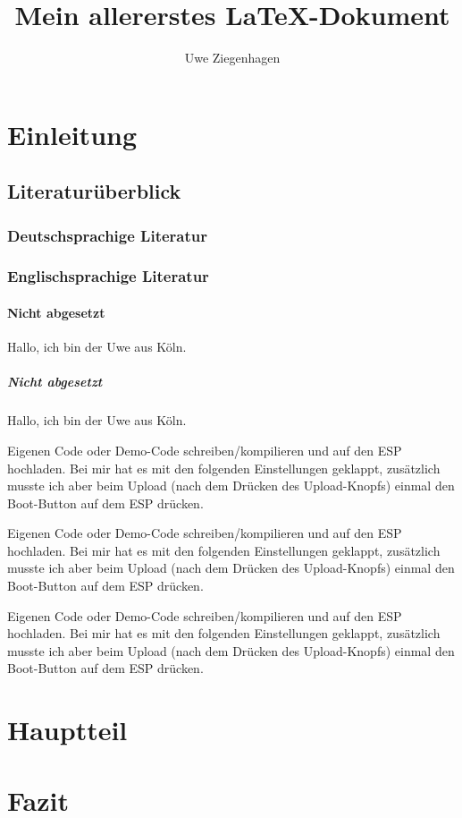 \documentclass[ngerman,12pt,parskip=half]{scrartcl}
\author{Uwe Ziegenhagen}
\title{Mein allererstes \LaTeX-Dokument}
\begin{document}
\maketitle

\tableofcontents

\section{Einleitung}
\subsection{Literaturüberblick}

\blindtext

\subsubsection{Deutschsprachige Literatur}

\blindtext

\subsubsection{Englischsprachige Literatur}

\blindtext

\paragraph{Nicht abgesetzt} Hallo, ich bin der Uwe aus Köln.

\subparagraph{Nicht abgesetzt} Hallo, ich bin der Uwe aus Köln.

Eigenen Code oder Demo-Code schreiben/kompilieren und auf den ESP hochladen. Bei mir hat es mit den folgenden Einstellungen geklappt, zusätzlich musste ich aber beim Upload (nach dem Drücken des Upload-Knopfs) einmal den Boot-Button auf dem ESP drücken.

Eigenen Code oder Demo-Code schreiben/kompilieren und auf den ESP hochladen. Bei mir hat es mit den folgenden Einstellungen geklappt, zusätzlich musste ich aber beim Upload (nach dem Drücken des Upload-Knopfs) einmal den Boot-Button auf dem ESP drücken.

Eigenen Code oder Demo-Code schreiben/kompilieren und auf den ESP hochladen. Bei mir hat es mit den folgenden Einstellungen geklappt, zusätzlich musste ich aber beim Upload (nach dem Drücken des Upload-Knopfs) einmal den Boot-Button auf dem ESP drücken.

\blindtext[10]

\section{Hauptteil}

\blindtext[10]

\section{Fazit}

\blindtext[10]
\end{document}
